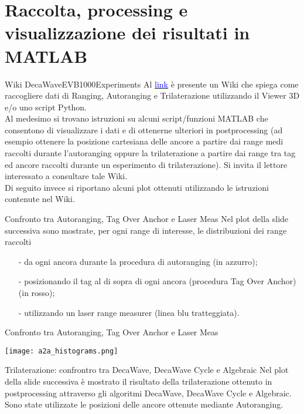 \section{Raccolta, processing e visualizzazione dei risultati in MATLAB}

\begin{frame}{Wiki DecaWaveEVB1000Experiments}
  Al \href{https://github.com/GiulioRomualdi/DecaWaveEVB1000Experiments/wiki}{\textcolor{blue}{link}} è presente un Wiki che spiega
  come raccogliere dati di Ranging, Autoranging e Trilaterazione utilizzando il Viewer 3D e/o uno script Python.\\
  Al medesimo si trovano istruzioni su alcuni script/funzioni MATLAB che consentono di visualizzare i dati e di ottenerne
  ulteriori in postprocessing (ad esempio ottenere la posizione cartesiana delle ancore a partire dai range medi
  raccolti durante l'autoranging oppure la trilaterazione a partire dai range tra tag ed ancore raccolti durante
  un esperimento di trilaterazione).
  Si invita il lettore interessato a consultare tale Wiki.\\
  Di seguito invece si riportano alcuni plot ottenuti utilizzando le istruzioni contenute nel Wiki.
\end{frame}

\begin{frame}{Confronto tra Autoranging, Tag Over Anchor e Laser Meas}
  Nel plot della slide successiva sono mostrate, per ogni range di interesse, le distribuzioni dei range raccolti
  \begin{itemize}
  \item[-] da ogni ancora durante la procedura di autoranging (in azzurro);
  \item[-] posizionando il tag al di sopra di ogni ancora (procedura Tag Over Anchor) (in rosso);
  \item[-] utilizzando un laser range measurer (linea blu tratteggiata).
  \end{itemize}
\end{frame}

\begin{frame}{Confronto tra Autoranging, Tag Over Anchor e Laser Meas}
  \begin{center}
    \texttt{[image: a2a\_histograms.png]}
  \end{center}
\end{frame}

\begin{frame}{Trilaterazione: confrontro tra DecaWave, DecaWave Cycle e Algebraic}
  Nel plot della slide successiva è mostrato il risultato della trilaterazione ottenuto
  in postprocessing attraverso gli algoritmi DecaWave, DecaWave Cycle e Algebraic.\\
  Sono state utilizzate le posizioni delle ancore ottenute mediante Autoranging.
\end{frame}

